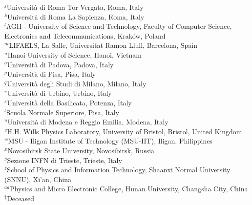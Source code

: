 \begin{flushleft}
{$ ^{j}$Universit{\`a} di Roma Tor Vergata, Roma, Italy\\
$ ^{k}$Universit{\`a} di Roma La Sapienza, Roma, Italy\\
$ ^{l}$AGH - University of Science and Technology, Faculty of Computer Science, Electronics and Telecommunications, Krak{\'o}w, Poland\\
$ ^{m}$LIFAELS, La Salle, Universitat Ramon Llull, Barcelona, Spain\\
$ ^{n}$Hanoi University of Science, Hanoi, Vietnam\\
$ ^{o}$Universit{\`a} di Padova, Padova, Italy\\
$ ^{p}$Universit{\`a} di Pisa, Pisa, Italy\\
$ ^{q}$Universit{\`a} degli Studi di Milano, Milano, Italy\\
$ ^{r}$Universit{\`a} di Urbino, Urbino, Italy\\
$ ^{s}$Universit{\`a} della Basilicata, Potenza, Italy\\
$ ^{t}$Scuola Normale Superiore, Pisa, Italy\\
$ ^{u}$Universit{\`a} di Modena e Reggio Emilia, Modena, Italy\\
$ ^{v}$H.H. Wills Physics Laboratory, University of Bristol, Bristol, United Kingdom\\
$ ^{w}$MSU - Iligan Institute of Technology (MSU-IIT), Iligan, Philippines\\
$ ^{x}$Novosibirsk State University, Novosibirsk, Russia\\
$ ^{y}$Sezione INFN di Trieste, Trieste, Italy\\
$ ^{z}$School of Physics and Information Technology, Shaanxi Normal University (SNNU), Xi'an, China\\
$ ^{aa}$Physics and Micro Electronic College, Hunan University, Changsha City, China\\
\medskip
$ ^{\dagger}$Deceased
}
\end{flushleft}
